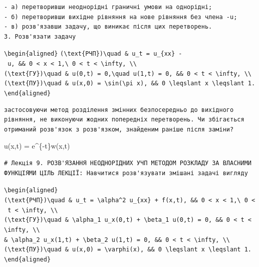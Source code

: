 \documentclass[
  ukrainian,
]{article}
\begin{document}
\begin{verbatim}
- а) перетворивши неоднорідні граничні умови на однорідні;
- б) перетворивши вихідне рівняння на нове рівняння без члена -u;
- в) розв'язавши задачу, що виникає після цих перетворень.
3. Розв'язати задачу
\end{verbatim}

\texttt{\textbackslash{}begin\{aligned\}}
\texttt{(\textbackslash{}text\{РЧП\})\textbackslash{}quad\ \&\ u\_t\ =\ u\_\{xx\}\ -\ u,\ \&\&\ 0\ \textless{}\ x\ \textless{}\ 1,\textbackslash{}\ 0\ \textless{}\ t\ \textless{}\ \textbackslash{}infty,\ \textbackslash{}\textbackslash{}}
\texttt{(\textbackslash{}text\{ГУ\})\textbackslash{}quad\ \&\ u(0,t)\ =\ 0,\textbackslash{}quad\ u(1,t)\ =\ 0,\ \&\&\ 0\ \textless{}\ t\ \textless{}\ \textbackslash{}infty,\ \textbackslash{}\textbackslash{}}
\texttt{(\textbackslash{}text\{ПУ\})\textbackslash{}quad\ \&\ u(x,0)\ =\ \textbackslash{}sin(\textbackslash{}pi\ x),\ \&\&\ 0\ \textbackslash{}leqslant\ x\ \textbackslash{}leqslant\ 1.}
\texttt{\textbackslash{}end\{aligned\}}

\begin{verbatim}
застосовуючи метод розділення змінних безпосередньо до вихідного рівняння, не виконуючи жодних попередніх перетворень. Чи збігається отриманий розв'язок з розв'язком, знайденим раніше після заміни?
\end{verbatim}

u(x,t) = e\^{}\{-t\}w(x,t)

\begin{verbatim}
# Лекція 9. РОЗВ'ЯЗАННЯ НЕОДНОРІДНИХ УЧП МЕТОДОМ РОЗКЛАДУ ЗА ВЛАСНИМИ ФУНКЦІЯМИ ЦІЛЬ ЛЕКЦІЇ: Навчитися розв'язувати змішані задачі вигляду
\end{verbatim}

\texttt{\textbackslash{}begin\{aligned\}}
\texttt{(\textbackslash{}text\{РЧП\})\textbackslash{}quad\ \&\ u\_t\ =\ \textbackslash{}alpha\^{}2\ u\_\{xx\}\ +\ f(x,t),\ \&\&\ 0\ \textless{}\ x\ \textless{}\ 1,\textbackslash{}\ 0\ \textless{}\ t\ \textless{}\ \textbackslash{}infty,\ \textbackslash{}\textbackslash{}}
\texttt{(\textbackslash{}text\{ГУ\})\textbackslash{}quad\ \&\ \textbackslash{}alpha\_1\ u\_x(0,t)\ +\ \textbackslash{}beta\_1\ u(0,t)\ =\ 0,\ \&\&\ 0\ \textless{}\ t\ \textless{}\ \textbackslash{}infty,\ \textbackslash{}\textbackslash{}}
\texttt{\&\ \textbackslash{}alpha\_2\ u\_x(1,t)\ +\ \textbackslash{}beta\_2\ u(1,t)\ =\ 0,\ \&\&\ 0\ \textless{}\ t\ \textless{}\ \textbackslash{}infty,\ \textbackslash{}\textbackslash{}}
\texttt{(\textbackslash{}text\{ПУ\})\textbackslash{}quad\ \&\ u(x,0)\ =\ \textbackslash{}varphi(x),\ \&\&\ 0\ \textbackslash{}leqslant\ x\ \textbackslash{}leqslant\ 1.}
\texttt{\textbackslash{}end\{aligned\}}
\end{document}
